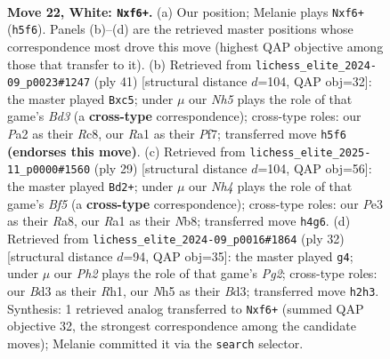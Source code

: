 \documentclass[11pt]{article}
\begin{document}
\clearpage

\begin{figure}[p]\centering
\begin{subfigure}{0.46\textwidth}\centering
\resizebox{\linewidth}{!}{%
\newchessgame
\chessboard[
  setfen={1nr3k1/rp1bbp2/p1q1pn2/B5pN/7N/3BP3/PP3PPP/R2QR1K1 w - - 1 22},
  showmover=false,
  pgfstyle=straightmove, color=movearrow, markmove={h5-f6}
]}
\caption{}
\end{subfigure}\hfill
\begin{subfigure}{0.46\textwidth}\centering
\resizebox{\linewidth}{!}{%
\newchessgame
\chessboard[
  setfen={2rq1rk1/p4ppp/P1bbp3/2N5/1pPBn3/5NP1/4PPBP/R2QR1K1 b - - 0 21},
  showmover=false,
  pgfstyle=straightmove, color=movearrow, markmove={d6-c5}
]}
\caption{}
\end{subfigure}
\\[4pt]
\begin{subfigure}{0.46\textwidth}\centering
\resizebox{\linewidth}{!}{%
\newchessgame
\chessboard[
  setfen={rn1q1rk1/pp3ppp/8/5N2/2P1nb2/1PN3P1/PB2B2P/R2QK2R b KQ - 0 15},
  showmover=false,
  pgfstyle=straightmove, color=movearrow, markmove={f4-d2}
]}
\caption{}
\end{subfigure}\hfill
\begin{subfigure}{0.46\textwidth}\centering
\resizebox{\linewidth}{!}{%
\newchessgame
\chessboard[
  setfen={r1b1nrk1/pp2ppq1/2p3p1/3N1n2/8/3B4/PPPQ1PP1/1K1R3R w - - 0 17},
  showmover=false,
  pgfstyle=straightmove, color=movearrow, markmove={g2-g4}
]}
\caption{}
\end{subfigure}
\caption{\textbf{Move 22, White: \texttt{Nxf6+}.} (a) Our position; Melanie plays \texttt{Nxf6+} (\texttt{h5f6}). Panels (b)--(d) are the retrieved master positions whose correspondence most drove this move (highest QAP objective among those that transfer to it). (b) Retrieved from \texttt{lichess\_elite\_2024-09\_p0023\#1247} (ply 41) [structural distance $d$=104, QAP obj=32]: the master played \texttt{Bxc5}; under $\mu$ our \emph{Nh5} plays the role of that game's \emph{Bd3} (a \textbf{cross-type} correspondence); cross-type roles: our \emph{P}a2 as their \emph{R}c8, our \emph{R}a1 as their \emph{P}f7; transferred move \texttt{h5f6} \textbf{(endorses this move)}. (c) Retrieved from \texttt{lichess\_elite\_2025-11\_p0000\#1560} (ply 29) [structural distance $d$=104, QAP obj=56]: the master played \texttt{Bd2+}; under $\mu$ our \emph{Nh4} plays the role of that game's \emph{Bf5} (a \textbf{cross-type} correspondence); cross-type roles: our \emph{P}e3 as their \emph{R}a8, our \emph{R}a1 as their \emph{N}b8; transferred move \texttt{h4g6}. (d) Retrieved from \texttt{lichess\_elite\_2024-09\_p0016\#1864} (ply 32) [structural distance $d$=94, QAP obj=35]: the master played \texttt{g4}; under $\mu$ our \emph{Ph2} plays the role of that game's \emph{Pg2}; cross-type roles: our \emph{B}d3 as their \emph{R}h1, our \emph{N}h5 as their \emph{B}d3; transferred move \texttt{h2h3}. Synthesis: 1 retrieved analog transferred to \texttt{Nxf6+} (summed QAP objective 32, the strongest correspondence among the candidate moves); Melanie committed it via the \texttt{search} selector.}
\label{fig:thought-m42}
\end{figure}
\end{document}
